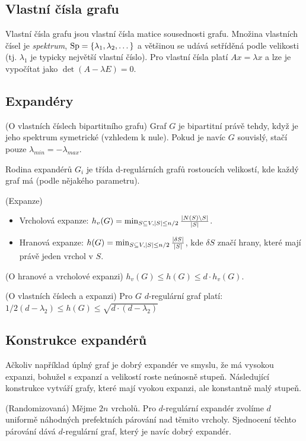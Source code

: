 
\subsection{Vlastní čísla grafu}

\df Vlastní čísla grafu jsou vlastní čísla matice sousednosti grafu. Množina 
vlastních čísel je {\it spektrum}, $\operatorname{Sp} = \{\lambda_1, \lambda_2, \dots\}$ a 
většinou se udává setříděná podle velikosti (tj. $\lambda_1$ je typicky 
největší vlastní číslo). Pro vlastní čísla platí $Ax = \lambda x$ a lze je 
vypočítat jako $\det(A - \lambda E) = 0$.

\subsection{Expandéry}

\vt (O vlastních číslech bipartitního grafu) Graf $G$ je bipartitní právě 
tehdy, když je jeho spektrum symetrické (vzhledem k nule). Pokud je navíc $G$ 
souvislý, stačí pouze $\lambda_{min} = -\lambda_{max}$.

\df Rodina expandérů $G_i$ je třída d-regulárních grafů rostoucích velikostí, 
kde každý graf má  (podle nějakého parametru).

\df (Expanze) \begin{itemize}
	\item Vrcholová expanze: $h_v(G) = \min_{S\subseteq V, |S|\leq n/2} 
	{|N(S)\setminus S| \over |S|}$.
	\item Hranová expanze: $h(G) = \min_{S\subseteq V, |S|\leq n/2} {|\delta S| 
	\over |S|}$, kde $\delta S$ značí hrany, které mají právě jeden vrchol v 
	$S$.
\end{itemize}

\poz (O hranové a vrcholové expanzi) $h_v(G) \leq h(G) \leq d \cdot h_v(G)$.

\vt (O vlastních číslech a expanzi) Pro $G$ $d$-regulární graf platí: $1/2(d - 
\lambda_2) \leq h(G) \leq \sqrt{d \cdot (d - \lambda_2)}$

\subsection{Konstrukce expandérů}

Ačkoliv například úplný graf je dobrý expandér ve smyslu, že má vysokou 
expanzi, bohužel s expanzí a velikostí roste neúnosně stupeň. Následující 
konstrukce vytváří grafy, které mají vyokou expanzi, ale konstantně malý 
stupeň.

\vt (Randomizovaná) Mějme $2n$ vrcholů. Pro $d$-regulární expandér zvolíme $d$ 
uniformě náhodných prefektních párování nad těmito vrcholy. Sjednocení těchto 
párování dává $d$-regulární graf, který je navíc dobrý expandér.

